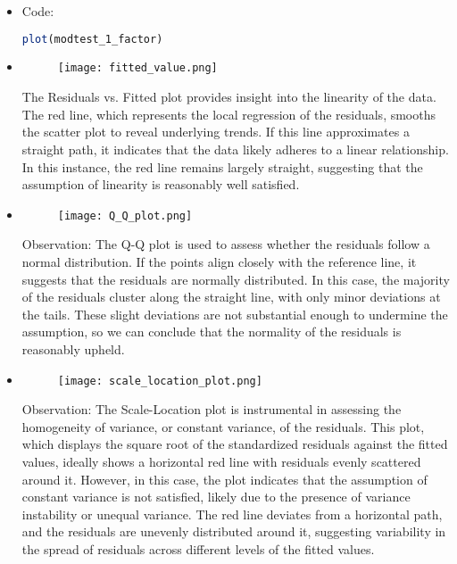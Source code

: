 \documentclass{article}
\begin{document}
	\begin{itemize}
		\item Code:
		\begin{lstlisting}[language=R]
			plot(modtest_1_factor)
		\end{lstlisting}
		\newpage
		\item 
		\begin{figure}[h]
			\centering
			\texttt{[image: fitted\_value.png]}
		\end{figure}    
		The Residuals vs. Fitted plot provides insight into the linearity of the data. The red line, which represents the local regression of the residuals, smooths the scatter plot to reveal underlying trends. If this line approximates a straight path, it indicates that the data likely adheres to a linear relationship. In this instance, the red line remains largely straight, suggesting that the assumption of linearity is reasonably well satisfied.
		
		\item 
		\begin{figure}[h]
			\centering
			\texttt{[image: Q\_Q\_plot.png]}
		\end{figure}
		Observation: The Q-Q plot is used to assess whether the residuals follow a normal distribution. If the points align closely with the reference line, it suggests that the residuals are normally distributed. In this case, the majority of the residuals cluster along the straight line, with only minor deviations at the tails. These slight deviations are not substantial enough to undermine the assumption, so we can conclude that the normality of the residuals is reasonably upheld.
		\newpage
		\item 
		\begin{figure}[h]
			\centering
			\texttt{[image: scale\_location\_plot.png]}
		\end{figure}
		Observation: The Scale-Location plot is instrumental in assessing the homogeneity of variance, or constant variance, of the residuals. This plot, which displays the square root of the standardized residuals against the fitted values, ideally shows a horizontal red line with residuals evenly scattered around it. However, in this case, the plot indicates that the assumption of constant variance is not satisfied, likely due to the presence of variance instability or unequal variance. The red line deviates from a horizontal path, and the residuals are unevenly distributed around it, suggesting variability in the spread of residuals across different levels of the fitted values.
		

\end{itemize}
\end{document}
